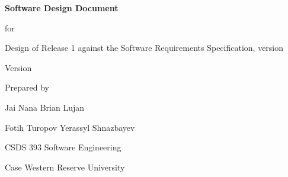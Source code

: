 \begin{titlepage}
  \centering
  \vspace*{3cm}
  {\Huge\bfseries Software Design Document\par}
  \vspace{0.6cm}
  {\LARGE for\par}
  \vspace{0.6cm}
  {\Huge\bfseries \SRSproduct\par}
  \vspace{0.4cm}
  {\Large Design of Release 1 against the Software Requirements Specification, version \SRSversion\par}
  \vspace{1.5cm}
  {\Large Version \SDDversion\par}
  \vspace{0.4cm}
  {\large \SDDdate\par}
  \vfill
  {\large Prepared by\par}
  {\Large Jai Nana \quad Brian Lujan\par Fotih Turopov \quad Yerassyl Shnazbayev\par}
  \vspace{0.8cm}
  {\large CSDS 393 Software Engineering\par Case Western Reserve University\par}
  \vspace{1cm}
\end{titlepage}

